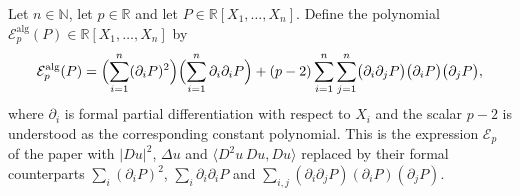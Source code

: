 \begin{definition}
Let $n\in\mathbb{N}$, let $p\in\mathbb{R}$ and let
$P\in\mathbb{R}[X_1,\dots,X_n]$. Define the polynomial
$\mathcal{E}^{\mathrm{alg}}_p(P)\in\mathbb{R}[X_1,\dots,X_n]$ by
\[
  \mathcal{E}^{\mathrm{alg}}_p(P)
  =\Bigl(\sum_{i=1}^{n}(\partial_iP)^2\Bigr)
    \Bigl(\sum_{i=1}^{n}\partial_i\partial_iP\Bigr)
   +(p-2)\sum_{i=1}^{n}\sum_{j=1}^{n}
      \bigl(\partial_i\partial_jP\bigr)\bigl(\partial_iP\bigr)\bigl(\partial_jP\bigr),
\]
where $\partial_i$ is formal partial differentiation with respect to $X_i$ and
the scalar $p-2$ is understood as the corresponding constant polynomial. This is
the expression $\mathcal{E}_p$ of the paper with $\lvert Du\rvert^2$, $\Delta u$
and $\langle D^2u\,Du,Du\rangle$ replaced by their formal counterparts
$\sum_i(\partial_iP)^2$, $\sum_i\partial_i\partial_iP$ and
$\sum_{i,j}(\partial_i\partial_jP)(\partial_iP)(\partial_jP)$.
\end{definition}
